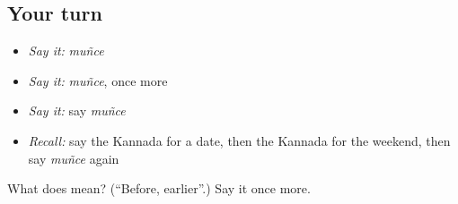 \subsection*{Your turn}
\begin{itemize}
\raggedright
  \item \emph{Say it:} \emph{muñce}
  \item \emph{Say it:} \emph{muñce}, once more
  \item \emph{Say it:} say \emph{muñce}
  \item \emph{Recall:} say the Kannada for a date, then the Kannada for the weekend, then say \emph{muñce} again
\end{itemize}

\begin{tcolorbox}[breakable,colback=teal!4,colframe=teal!35!black,title={Before you move on}]
What does  mean? (\textquotedblleft{}Before, earlier\textquotedblright{}.) Say it once more.
\end{tcolorbox}
